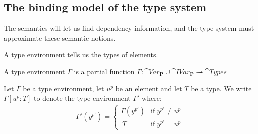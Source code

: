 \documentclass{llncs}
\begin{document}
\subsection{The binding model of the type system}\label{sec:basis}

The semantics will let us find dependency information, and the type 
system must approximate these semantic notions.





A type environment tells us the types of elements.

\begin{definition}
  A type environment $\Gamma$ is a partial function $\Gamma:\cat{Var}_{\mathbf{P}}\cup\cat{IVar}_{\mathbf{P}}\rightharpoonup\cat{Types}$
\end{definition}

\begin{definition}
	Let $\Gamma$ be a type environment, let $u^p$ be an element
        and let $T$ be a type.
	We write $\Gamma[u^p:T]$ to denote the type environment $\Gamma'$ where:
	\begin{align*}
		\Gamma'(y^{p'})=
		\left\{\begin{matrix}
			\Gamma(y^{p'}) & \mbox{if}\;y^{p'}\neq u^{p}\\\	 
			T & \mbox{if}\;y^{p'}=u^{p}
		\end{matrix}\right.
	\end{align*}
\end{definition}
\end{document}
